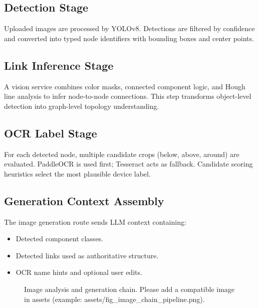 \documentclass[12pt,a4paper,openany]{report}
\begin{document}
\subsection{Detection Stage}

Uploaded images are processed by YOLOv8. Detections are filtered by confidence and converted into typed node identifiers with bounding boxes and center points.

\subsection{Link Inference Stage}

A vision service combines color masks, connected component logic, and Hough line analysis to infer node-to-node connections. This step transforms object-level detection into graph-level topology understanding.

\subsection{OCR Label Stage}

For each detected node, multiple candidate crops (below, above, around) are evaluated. PaddleOCR is used first; Tesseract acts as fallback. Candidate scoring heuristics select the most plausible device label.

\subsection{Generation Context Assembly}

The image generation route sends LLM context containing:
\begin{itemize}
    \item Detected component classes.
    \item Detected links used as authoritative structure.
    \item OCR name hints and optional user edits.
\end{itemize}

\begin{figure}[H]
    \centering
    \caption{Image analysis and generation chain. Please add a compatible image in assets (example: assets/fig_image_chain_pipeline.png).}
    \label{fig:image_chain_pipeline}
\end{figure}
\end{document}
